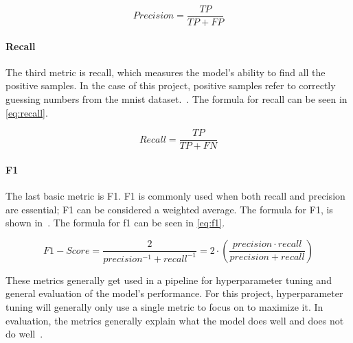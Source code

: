 \begin{equation}
    Precision = \frac{TP}{TP + FP}
\end{equation}\label{eq:precision}

\paragraph{Recall} The third metric is recall, which measures the model's ability to find all the positive samples. In the case of this project, positive samples refer to correctly guessing numbers from the \gls{mnist} dataset.~\cite{metrics-for-multi}. The formula for recall can be seen in \ref{eq:recall}.

\begin{equation}
    Recall = \frac{TP}{TP + FN}
\end{equation}\label{eq:recall}

\paragraph{F1} The last basic metric is F1. F1 is commonly used when both recall and precision are essential; F1 can be considered a weighted average. The formula for F1, is shown in~\cite{metrics-for-multi}. The formula for f1 can be seen in \ref{eq:f1}.

\begin{equation}
    F1-Score = \frac{2}{precision^{-1} + recall^{-1}} = 2\cdot (\frac{precision \cdot recall}{precision + recall})
\end{equation}\label{eq:f1}

These metrics generally get used in a pipeline for hyperparameter tuning and general evaluation of the model's performance. For this project, hyperparameter tuning will generally only use a single metric to focus on to maximize it. In evaluation, the metrics generally explain what the model does well and does not do well~\cite{james-statistical-learning}. 






